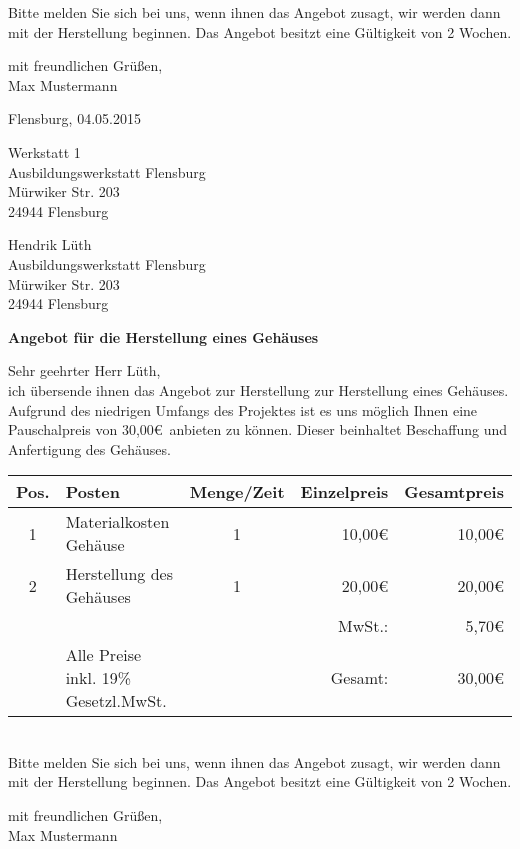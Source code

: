 \documentclass[a4paper,12pt]{article}
\begin{document}
\begin{flushleft}
Bitte melden Sie sich bei uns, wenn ihnen das Angebot zusagt, wir werden dann mit der Herstellung beginnen. Das Angebot besitzt eine Gültigkeit von 2 Wochen.
\bigskip

mit freundlichen Grüßen,\\
\bigskip
Max Mustermann
\end{flushleft}
\pagebreak
Flensburg, 04.05.2015
\begin{flushright}
Werkstatt 1\\
Ausbildungswerkstatt Flensburg\\
Mürwiker Str. 203\\
24944 Flensburg
\end{flushright}
\bigskip
\bigskip
\bigskip
Hendrik Lüth\\
Ausbildungswerkstatt Flensburg\\
Mürwiker Str. 203\\
24944 Flensburg\\
\begin{flushleft}
\bigskip

\textbf{Angebot für die Herstellung eines Gehäuses}
\bigskip
\bigskip

Sehr geehrter Herr Lüth,\\
\bigskip
ich übersende ihnen das Angebot zur Herstellung zur Herstellung eines Gehäuses.\\
Aufgrund des niedrigen Umfangs des Projektes ist es uns möglich Ihnen eine Pauschalpreis von 30,00\euro\ anbieten zu können. Dieser beinhaltet Beschaffung und Anfertigung des Gehäuses.\\
\bigskip
\begin{tabular}{cp{7cm}cr|r|}
\hline
\multicolumn{1}{|l|}{Pos.} & \multicolumn{1}{l|}{Posten} & \multicolumn{1}{l|}{Menge/Zeit} & Einzelpreis & Gesamtpreis \\ \hline
\multicolumn{1}{|c|}{1} & \multicolumn{1}{l|}{Materialkosten Gehäuse} & \multicolumn{1}{c|}{1} & 10,00\euro & 10,00\euro \\ \hline
\multicolumn{1}{|c|}{2} & \multicolumn{1}{l|}{Herstellung des Gehäuses} & \multicolumn{1}{c|}{1} & 20,00\euro & 20,00\euro \\ \hline
 & & & MwSt.: & 5,70\euro \\ \cline{5-5}
                       & Alle Preise inkl. 19\% Gesetzl.MwSt. &                       & Gesamt: & 30,00\euro \\ \cline{5-5} 
\end{tabular}\\
\bigskip
Bitte melden Sie sich bei uns, wenn ihnen das Angebot zusagt, wir werden dann mit der Herstellung beginnen. Das Angebot besitzt eine Gültigkeit von 2 Wochen.
\bigskip

mit freundlichen Grüßen,\\
\bigskip
Max Mustermann
\end{flushleft}
\end{document}
